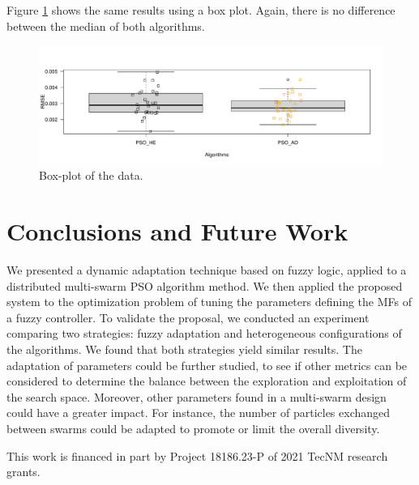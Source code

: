 \documentclass[runningheads]{llncs}
\begin{document}
 Figure \ref{fig:boxplot} shows the same results using a box plot. Again, there is no difference between the median of both algorithms.

\begin{figure}[htbp]
  \centering
  \includegraphics[angle=0,width=1\textwidth]{RplotAjusteParam.pdf}
  \caption{Box-plot of the data.}
  \label{fig:boxplot} 
\end{figure}

\section{Conclusions and Future Work}\label{sec:conclusions}

We presented a dynamic adaptation technique based on fuzzy logic, applied to a distributed multi-swarm PSO algorithm method. We then applied the proposed system to the optimization problem of tuning the parameters defining the MFs of a fuzzy controller. To validate the proposal, we conducted an experiment comparing two strategies: fuzzy adaptation and heterogeneous configurations of the algorithms. We found that both strategies yield similar results. The adaptation of parameters could be further studied, to see if other metrics can be considered to determine the balance between the exploration and exploitation of the search space. Moreover, other parameters found in a multi-swarm design could have a greater impact. For instance, the number of particles exchanged between swarms could be adapted to promote or limit the overall diversity.

\begin{acknowledgement}
    This work is financed in part by Project 18186.23-P of 2021 TecNM research grants.
\end{acknowledgement}

%
%
%


%

\end{document}
